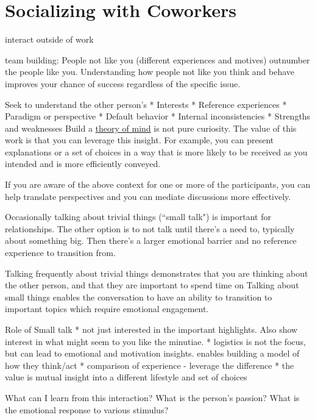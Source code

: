 \section{Socializing with Coworkers\label{sec:socializing}}

interact outside of work

team building:
People not like you (different experiences and motives) outnumber the people like you.
Understanding how people not like you think and behave improves your chance of success regardless of the specific issue.

Seek to understand the other person's
* Interests
* Reference experiences
* Paradigm or perspective
* Default behavior
* Internal inconsistencies
* Strengths and weaknesses
Build a \href{https://en.wikipedia.org/wiki/Theory_of_mind}{theory of mind} is not pure curiosity. The value of this work is that you can leverage this insight. For example, you can present explanations or a set of choices in a way that is more likely to be received as you intended and is more efficiently conveyed.  

If you are aware of the above context for one or more of the participants, you can help translate perspectives and you can mediate discussions more effectively. 

Occasionally talking about trivial things (``small talk") is important for relationships.
The other option is to not talk until there's a need to, typically about something big. Then there's a larger emotional barrier and no reference experience to transition from.

Talking frequently about trivial things demonstrates that you are thinking about the other person, and that they are important to spend time on
Talking about small things enables the conversation to have an ability to transition to important topics which require emotional engagement.

Role of Small talk
* not just interested in the important highlights. Also show interest in what might seem to you like the minutiae. 
* logistics is not the focus, but can lead to emotional and motivation insights. enables building a model of how they think/act
* comparison of experience - leverage the difference
* the value is mutual insight into a different lifestyle and set of choices

What can I learn from this interaction?
What is the person's passion?
What is the emotional response to various stimulus?


